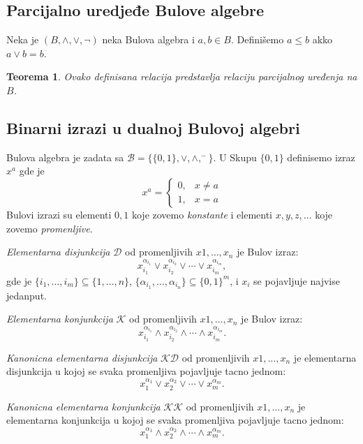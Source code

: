 \documentclass[12p,14paper]{article}
\newtheorem*{theorem}{Teorema}
\begin{document}
\begin{multicols}{2}
\subsection{Parcijalno uredjeđe Bulove algebre}

    Neka je $(B, \land, \lor, \neg)$ neka Bulova algebra i $a,b \in B$. 
    Definišemo $a \leq b$ akko $a \lor b = b$.

    \begin{theorem}
        Ovako definisana relacija predstavlja relaciju parcijalnog uređenja
        na $B$.
    \end{theorem}

\subsection{Binarni izrazi u dualnoj Bulovoj algebri}

    Bulova algebra je zadata sa 
    $\mathcal{B} = \{ \{0, 1\}, \lor, \land, ^{-}\}$.
    U Skupu $\{0, 1\}$ definisemo izraz $x^a$ gde je
    \[
        x^a = 
            \begin{cases}
                0, & x \neq a \\
                1, & x = a
            \end{cases}
    \]
    Bulovi izrazi su elementi $0, 1$ koje zovemo \textit{konstante} i elementi
    $x, y, z, \ldots$ koje zovemo \textit{promenljive}.

    \textit{Elementarna disjunkcija} $\mathcal{D}$ od promenljivih 
    $x1, \ldots, x_n$ je Bulov izraz:
    \[
        x_{i_1}^{\alpha_{i_1}} \lor x_{i_2}^{\alpha_{i_2}} \lor \cdots
        \lor x_{i_m}^{\alpha_{i_m}},
    \]
    gde je $\{i_1, \ldots, i_m\} \subseteq \{1, \ldots, n\}$, 
    $\{\alpha_{i_1}, \ldots, \alpha_{i_n}\} \subseteq {\{0, 1\}}^m$, 
    i $x_i$ se pojavljuje najvise jedanput.

    \textit{Elementarna konjunkcija} $\mathcal{K}$ od promenljivih 
    $x1, \ldots, x_n$ je Bulov izraz:
    \[
        x_{i_1}^{\alpha_{i_1}} \land x_{i_2}^{\alpha_{i_2}} \land \cdots
        \land x_{i_m}^{\alpha_{i_m}}.
    \]

    \textit{Kanonicna elementarna disjunkcija} $\mathcal{KD}$ od promenljivih 
    $x1, \ldots, x_n$ je elementarna disjunkcija u kojoj se svaka promenljiva 
    pojavljuje tacno jednom:
    \[
        x_{1}^{\alpha_{1}} \lor x_{2}^{\alpha_{2}} \lor \cdots
        \lor x_{m}^{\alpha_{m}}.
    \]

    \textit{Kanonicna elementarna konjunkcija} $\mathcal{KK}$ od promenljivih 
    $x1, \ldots, x_n$ je elementarna konjunkcija u kojoj se svaka promenljiva 
    pojavljuje tacno jednom:
    \[
        x_{1}^{\alpha_{1}} \land x_{2}^{\alpha_{2}} \land \cdots
        \land x_{m}^{\alpha_{m}}.
    \]


\end{multicols}
\end{document}
